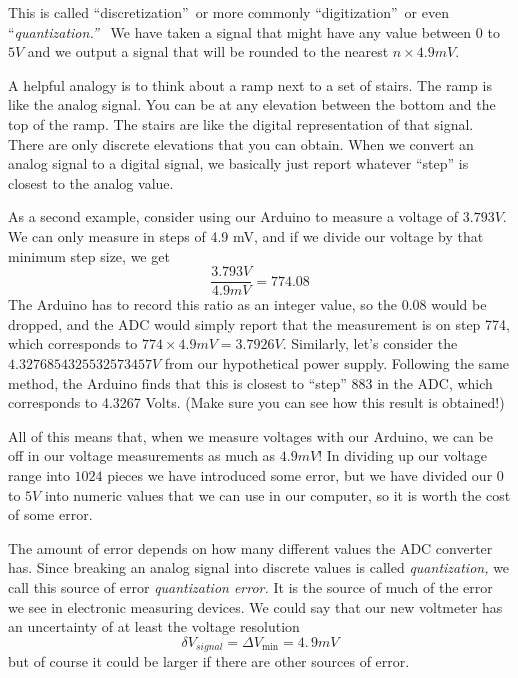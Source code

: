 
This is called \textquotedblleft discretization\textquotedblright\ or more
commonly \textquotedblleft digitization\textquotedblright\ or even
\textquotedblleft \emph{quantization.\textquotedblright\ } We have taken a
signal that might have any value between $0$ to $5\unit{V}$ and we output a
signal that will be rounded to the nearest $n\times 4.9\unit{mV}.$

A helpful analogy is to think about a ramp next to a set of stairs. The ramp
is like the analog signal. You can be at any elevation between the bottom and
the top of the ramp. The stairs are like the digital representation of that
signal. There are only discrete elevations that you can obtain. When we convert
an analog signal to a digital signal, we basically just report whatever ``step''
is closest to the analog value.

As a second example, consider using our Arduino to measure a voltage of
$3.793\unit{V}$. We can only measure in steps of 4.9 mV, and if we divide
our voltage by that minimum step size, we get 
\begin{equation*}
\frac{3.793\unit{V}}{4.9\unit{mV}}=774.08
\end{equation*}
The Arduino has to record this ratio as an integer value, so the 0.08 would be
dropped, and the ADC would simply report that the measurement is on step 774,
which corresponds to $774\times4.9\unit{mV}=3.7926\unit{V}$. Similarly, let's 
consider the $4.3276854325532573457\unit{V}$ from our hypothetical power supply.
Following the same method, the Arduino finds that this is closest to ``step'' 
883 in the ADC, which corresponds to 4.3267 Volts. (Make sure you can see how
this result is obtained!)

All of this means that, when we measure voltages with our Arduino, 
we can be off in our voltage measurements as much as $4.9%
\unit{mV}$! In dividing up our voltage range into $1024$ pieces we have
introduced some error, but we have divided our $0$ to $5\unit{V}$ into
numeric values that we can use in our computer, so it is worth the cost of
some error.

The amount of error depends on how many different values the ADC converter
has. Since breaking an analog signal into discrete values is called \emph{%
quantization, }we call this source of error \emph{quantization error.} It is
the source of much of the error we see in electronic measuring devices. We
could say that our new voltmeter has an uncertainty of at least the voltage
resolution%
\begin{equation*}
\delta V_{signal}=\Delta V_{\min }=4.\,\allowbreak 9\unit{mV}
\end{equation*}%
but of course it could be larger if there are other sources of error.

